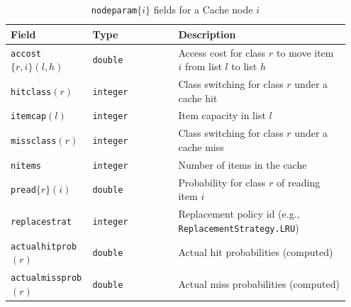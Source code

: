 \begin{MATLAB}
\begin{center}
\begin{table}[thbp]
{\scriptsize
\renewcommand{\arraystretch}{1.2}
\centering
\caption{\texttt{nodeparam}$\{i\}$ fields for a Cache node $i$} %
\begin{tabular}{|p{0.20\linewidth}|p{0.25\linewidth}|p{0.50\linewidth}|}
\hline
\textbf{Field} & \textbf{Type} & \textbf{Description} \\
\hline
\texttt{accost}$\{r,i\}(l,h)$ & \texttt{double} & Access cost for class $r$ to move item $i$ from list $l$ to list $h$\\\hline
\texttt{hitclass}$(r)$ & \texttt{integer} & Class switching for class $r$ under a cache hit\\\hline
\texttt{itemcap}$(l)$ & \texttt{integer} & Item capacity in list $l$\\\hline
\texttt{missclass}$(r)$ & \texttt{integer} & Class switching for class $r$ under a cache miss\\\hline
\texttt{nitems} & \texttt{integer} & Number of items in the cache\\\hline
\texttt{pread}$\{r\}(i)$ & \texttt{double} & Probability for class $r$ of reading item $i$\\\hline
\texttt{replacestrat} & \texttt{integer} & Replacement policy id (e.g., \texttt{ReplacementStrategy.LRU})\\\hline
\texttt{actualhitprob}$(r)$ & \texttt{double} & Actual hit probabilities (computed)\\\hline
\texttt{actualmissprob}$(r)$ & \texttt{double} & Actual miss probabilities (computed)\\\hline
\end{tabular}
}
\label{TAB_CACHEPAR}
\end{table}
\end{center}
\end{MATLAB}
